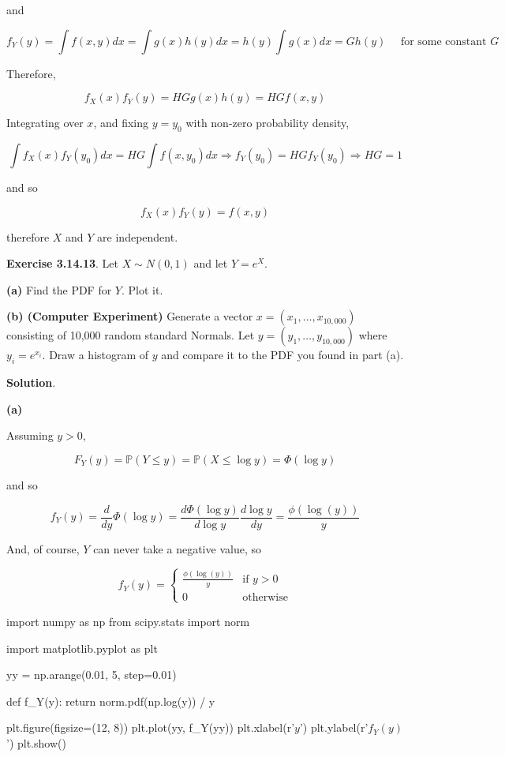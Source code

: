 and

\[ f_Y(y) = \int f(x, y) dx = \int g(x) h(y) dx = h(y) \int g(x) dx = G h(y) \quad \text{ for some constant } G \]

Therefore,

\[ f_X(x) f_Y(y) = HG g(x) h(y) = HG f(x, y) \]

Integrating over \(x\), and fixing \(y = y_{0}\) with non-zero probability
density,

\[ \int f_X(x) f_Y(y_{0}) dx = HG \int f(x, y_{0}) dx \Longrightarrow f_Y(y_{0}) = HG f_Y(y_{0}) \Longrightarrow HG = 1 \]

and so

\[ f_X(x) f_Y(y) = f(x, y) \]

therefore \(X\) and \(Y\) are independent.

\textbf{Exercise 3.14.13}. Let \(X \sim N(0, 1)\) and let \(Y = e^X\).

\textbf{(a)} Find the PDF for \(Y\). Plot it.

\textbf{(b) (Computer Experiment)} Generate a vector
\(x = (x_{1}, \dots, x_{10,000})\) consisting of 10,000 random standard
Normals. Let \(y = (y_{1}, \dots, y_{10,000})\) where \(y_{i} = e^{x_{i}}\).
Draw a histogram of \(y\) and compare it to the PDF you found in part
(a).

\textbf{Solution}.

\textbf{(a)}

Assuming \(y > 0\),

\[ F_Y(y) = \mathbb{P}(Y \leq y) = \mathbb{P}(X \leq \log y) = \Phi(\log y) \]

and so

\[ f_Y(y) = \frac{d}{dy} \Phi(\log y) = \frac{d \Phi(\log y)}{d \log y} \frac{d \log y}{dy} = \frac{\phi(\log(y))}{y} \]

And, of course, \(Y\) can never take a negative value, so

\[ f_Y(y) = \begin{cases}
\frac{\phi(\log(y))}{y} &\text{if } y > 0 \\
0 &\text{otherwise}
\end{cases} \]

\begin{python}
import numpy as np
from scipy.stats import norm

import matplotlib.pyplot as plt

yy = np.arange(0.01, 5, step=0.01)

def f_Y(y):
    return norm.pdf(np.log(y)) / y

plt.figure(figsize=(12, 8))
plt.plot(yy, f_Y(yy))
plt.xlabel(r'$y$')
plt.ylabel(r'$f_Y(y)$')
plt.show()
\end{python}

